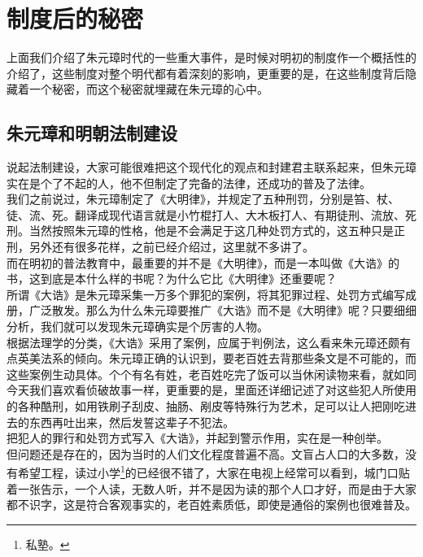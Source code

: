 \section{制度后的秘密}
\ifnum{}
	\begin{multicols}{\theparacolNo}
\fi
上面我们介绍了朱元璋时代的一些重大事件，是时候对明初的制度作一个概括性的介绍了，这些制度对整个明代都有着深刻的影响，更重要的是，在这些制度背后隐藏着一个秘密，而这个秘密就埋藏在朱元璋的心中。\\

\subsection{朱元璋和明朝法制建设}
说起法制建设，大家可能很难把这个现代化的观点和封建君主联系起来，但朱元璋实在是个了不起的人，他不但制定了完备的法律，还成功的普及了法律。\\

我们之前说过，朱元璋制定了《大明律》，并规定了五种刑罚，分别是笞、杖、徒、流、死。翻译成现代语言就是小竹棍打人、大木板打人、有期徒刑、流放、死刑。当然按照朱元璋的性格，他是不会满足于这几种处罚方式的，这五种只是正刑，另外还有很多花样，之前已经介绍过，这里就不多讲了。\\

而在明初的普法教育中，最重要的并不是《大明律》，而是一本叫做《大诰》的书，这到底是本什么样的书呢？为什么它比《大明律》还重要呢？\\

所谓《大诰》是朱元璋采集一万多个罪犯的案例，将其犯罪过程、处罚方式编写成册，广泛散发。那么为什么朱元璋要推广《大诰》而不是《大明律》呢？只要细细分析，我们就可以发现朱元璋确实是个厉害的人物。\\

根据法理学的分类，《大诰》采用了案例，应属于判例法，这么看来朱元璋还颇有点英美法系的倾向。朱元璋正确的认识到，要老百姓去背那些条文是不可能的，而这些案例生动具体。个个有名有姓，老百姓吃完了饭可以当休闲读物来看，就如同今天我们喜欢看侦破故事一样，更重要的是，里面还详细记述了对这些犯人所使用的各种酷刑，如用铁刷子刮皮、抽肠、剐皮等特殊行为艺术，足可以让人把刚吃进去的东西再吐出来，然后发誓这辈子不犯法。\\

把犯人的罪行和处罚方式写入《大诰》，并起到警示作用，实在是一种创举。\\

但问题还是存在的，因为当时的人们文化程度普遍不高。文盲占人口的大多数，没有希望工程，读过小学\footnote{私塾。}的已经很不错了，大家在电视上经常可以看到，城门口贴着一张告示，一个人读，无数人听，并不是因为读的那个人口才好，而是由于大家都不识字，这是符合客观事实的，老百姓素质低，即使是通俗的案例也很难普及。\\


\end{multicols}
